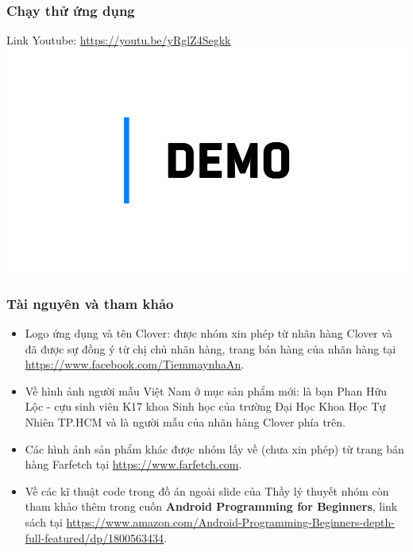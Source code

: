 \documentclass{beamer}
\begin{document}
\begin{frame}
    \frametitle{Chạy thử ứng dụng}
    \begin{center}
        \Large{Link Youtube: \href{https://youtu.be/yRglZ4Segkk}{\color{blue} https://youtu.be/yRglZ4Segkk}}
        \includegraphics[width=\textwidth]{images/demo.png}
    \end{center}
\end{frame}

\begin{frame}
    \frametitle{Tài nguyên và tham khảo}
    \begin{itemize}
        \item Logo ứng dụng và tên Clover: được nhóm xin phép từ nhãn hàng Clover và đã được sự đồng ý từ chị chủ nhãn hàng, trang bán hàng của nhãn hàng tại \href{https://www.facebook.com/TiemmaynhaAn}{\color{blue} https://www.facebook.com/TiemmaynhaAn}.
        \item Về hình ảnh người mẫu Việt Nam ở mục sản phẩm mới: là bạn Phan Hữu Lộc - cựu sinh viên K17 khoa Sinh học của trường Đại Học Khoa Học Tự Nhiên TP.HCM và là người mẫu của nhãn hàng Clover phía trên.
        \item Các hình ảnh sản phẩm khác được nhóm lấy về (chưa xin phép) từ trang bán hàng Farfetch tại \href{https://www.farfetch.com}{\color{blue} https://www.farfetch.com}.
        \item Về các kĩ thuật code trong đồ án ngoài slide của Thầy lý thuyết nhóm còn tham khảo thêm trong cuốn \textbf{\color{teal} Android Programming for Beginners}, link sách tại \href{https://www.amazon.com/Android-Programming-Beginners-depth-full-featured/dp/1800563434}{\color{blue} https://www.amazon.com/Android-Programming-Beginners-depth-full-featured/dp/1800563434}.
    \end{itemize}
\end{frame}
\end{document}
